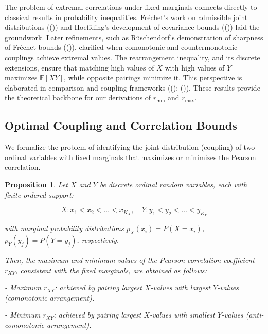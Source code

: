\documentclass[
  12pt,
]{article}
\theoremstyle{plain}
\newtheorem{proposition}[theorem]{Proposition}
\theoremstyle{definition}
\theoremstyle{remark}
\begin{document}
The problem of extremal correlations under fixed marginals connects
directly to classical results in probability inequalities. Fréchet's
work on admissible joint distributions
(()) and Hoeffding's
development of covariance bounds
(()) laid the
groundwork. Later refinements, such as Rüschendorf's demonstration of
sharpness of Fréchet bounds
(()), clarified when
comonotonic and countermonotonic couplings achieve extremal values. The
rearrangement inequality, and its discrete extensions, ensure that
matching high values of \(X\) with high values of \(Y\) maximizes
\(\mathbb{E}[XY]\), while opposite pairings minimize it. This
perspective is elaborated in comparison and coupling frameworks
(();
()). These results
provide the theoretical backbone for our derivations of \(r_{\min}\) and
\(r_{\max}\).

\subsection{Optimal Coupling and Correlation
Bounds}\label{optimal-coupling-and-correlation-bounds}

We formalize the problem of identifying the joint distribution
(coupling) of two ordinal variables with fixed marginals that maximizes
or minimizes the Pearson correlation.

\label{prop-max-product}
\begin{proposition}

Let $X$ and $Y$ be discrete ordinal random variables, each with finite ordered support:

$$
X: x_1 < x_2 < \dots < x_{K_X},\quad Y: y_1 < y_2 < \dots < y_{K_Y}
$$

with marginal probability distributions $p_X(x_i) = P(X = x_i)$, $p_Y(y_j) = P(Y = y_j)$, respectively.

Then, the maximum and minimum values of the Pearson correlation coefficient $r_{XY}$, consistent with the fixed marginals, are obtained as follows:

- Maximum $r_{XY}$: achieved by pairing largest $X$-values with largest $Y$-values (comonotonic arrangement).
    
- Minimum $r_{XY}$: achieved by pairing largest $X$-values with smallest $Y$-values (anti-comonotonic arrangement).
\end{proposition}
\end{document}
